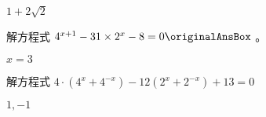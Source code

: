 \begin{QUESTIONS}
\begin{QUESTION}
\begin{QBODY}
    \end{QBODY}
    \begin{QFROMS}
    \end{QFROMS}
    \begin{QTAGS} \end{QTAGS}
    \begin{QANS}
        $1+2\sqrt{2}$
    \end{QANS}
    \begin{QSOL}
    \end{QSOL}
    \begin{QEMPTYSPACE}
    \end{QEMPTYSPACE}
\end{QUESTION}
\begin{QUESTION}
    \begin{QBODY}
        解方程式 ${{4}^{x+1}}-31\times {{2}^{x}}-8=0 \originalAnsBox $ 。
    \end{QBODY}
    \begin{QFROMS}
    \end{QFROMS}
    \begin{QTAGS} \end{QTAGS}
    \begin{QANS}
        $x=3$
    \end{QANS}
    \begin{QSOL}
    \end{QSOL}
    \begin{QEMPTYSPACE}
    \end{QEMPTYSPACE}
\end{QUESTION}
\begin{QUESTION}
    \begin{QBODY}
        解方程式 $4\cdot \left( {{4}^{x}}+{{4}^{-x}} \right)-12\left( {{2}^{x}}+{{2}^{-x}} \right)+13=0$
    \end{QBODY}
    \begin{QFROMS}
    \end{QFROMS}
    \begin{QTAGS} \end{QTAGS}
    \begin{QANS}
        $1,-1$
    \end{QANS}
    \begin{QSOL}
    \end{QSOL}
    \begin{QEMPTYSPACE}
    \end{QEMPTYSPACE}
\end{QUESTION}
\begin{QUESTION}

\end{QUESTION}
\end{QUESTIONS}
